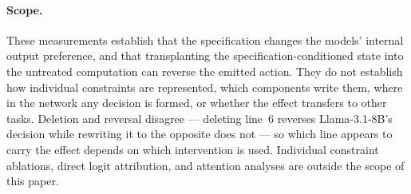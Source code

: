 \paragraph{Scope.}
These measurements establish that the specification changes the models' internal
output preference, and that transplanting the specification-conditioned state into
the untreated computation can reverse the emitted action. They do not establish how
individual constraints are represented, which components write them, where in the
network any decision is formed, or whether the effect transfers to other tasks.
Deletion and reversal disagree --- deleting line~6 reverses Llama-3.1-8B's decision
while rewriting it to the opposite does not --- so which line appears to carry the
effect depends on which intervention is used. Individual constraint ablations, direct
logit attribution, and attention analyses are outside the scope of this paper.
